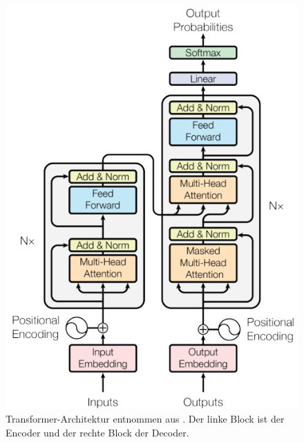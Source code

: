 \documentclass[12pt,letterpaper,ngerman]{article}
\begin{document}
\begin{figure}[H]
  \begin{center}
    \includegraphics[scale=0.35]{abb/transformer-figure.png}
  \end{center}
  \caption{
      Transformer-Architektur entnommen aus \cite{transformer}.
      Der linke Block ist der Encoder und der rechte Block der Decoder.
  }
\end{figure} 
\end{document}
